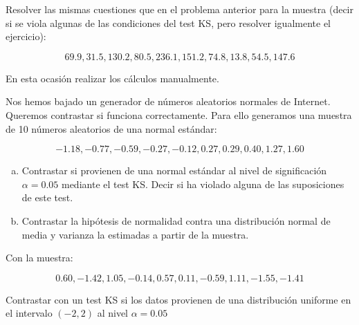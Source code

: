 \documentclass[12pt]{article}\usepackage[]{graphicx}\usepackage[]{color}
\begin{document}
\begin{prob}
Resolver las mismas cuestiones que en el problema anterior para la muestra (decir si se viola algunas de las condiciones del test KS, pero resolver igualmente el ejercicio):

$$69.9,  31.5, 130.2,  80.5, 236.1, 151.2,  74.8,  13.8,  54.5, 147.6$$

En esta ocasión realizar los cálculos manualmente.

\end{prob}

\begin{prob}
Nos hemos bajado un generador de números aleatorios normales de Internet. Queremos contrastar si funciona correctamente. Para ello generamos una muestra de 10 números aleatorios de una normal estándar:

$$ -1.18, -0.77, -0.59, -0.27, -0.12,  0.27,  0.29,  0.40,  1.27,  1.60
$$

\begin{enumerate}[a)]
\item Contrastar si provienen de una normal estándar al nivel de significación $\alpha=0.05$ mediante el test KS. Decir si ha violado alguna de las suposiciones de este test.
\item Contrastar la hipótesis de normalidad contra una distribución normal de media y varianza la estimadas a partir de la muestra.
\end{enumerate}

\end{prob}

\begin{prob} Con la muestra:

$$0.60, -1.42,  1.05, -0.14,  0.57,  0.11, -0.59, 1.11, -1.55, -1.41
$$

Contrastar con un test KS si los datos provienen de una distribución uniforme en el intervalo $(-2,2)$ al nivel $\alpha=0.05$
\end{prob}
\end{document}
